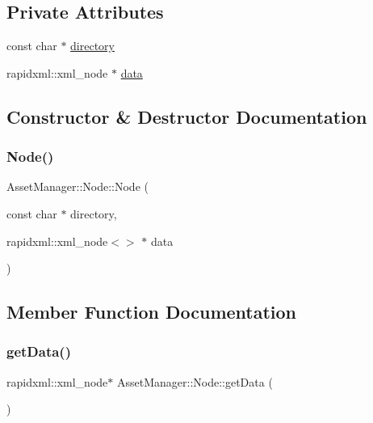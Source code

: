 \subsection*{Private Attributes}
\begin{DoxyCompactItemize}
\item 
const char $\ast$ \hyperlink{class_asset_manager_1_1_node_a26aef3543a3e17b4412ab227fca00ad6}{directory}
\item 
rapidxml\+::xml\+\_\+node $\ast$ \hyperlink{class_asset_manager_1_1_node_addfff47185d0626ec038163a7412fb5f}{data}
\end{DoxyCompactItemize}


\subsection{Constructor \& Destructor Documentation}
\mbox{\label{class_asset_manager_1_1_node_a4ae9e2e6a0b3c35d73d2c4feb00d75ee}} 
\subsubsection{\texorpdfstring{Node()}{Node()}}
{\footnotesize\ttfamily Asset\+Manager\+::\+Node\+::\+Node (\begin{DoxyParamCaption}\item[{const char $\ast$}]{directory,  }\item[{rapidxml\+::xml\+\_\+node$<$$>$ $\ast$}]{data }\end{DoxyParamCaption})\hspace{0.3cm}{\ttfamily [inline]}}



\subsection{Member Function Documentation}
\mbox{\label{class_asset_manager_1_1_node_a908a7d3bbf9b654ab9dc1a7c5cd1e686}} 
\subsubsection{\texorpdfstring{get\+Data()}{getData()}}
{\footnotesize\ttfamily rapidxml\+::xml\+\_\+node$\ast$ Asset\+Manager\+::\+Node\+::get\+Data (\begin{DoxyParamCaption}{ }\end{DoxyParamCaption})\hspace{0.3cm}{\ttfamily [inline]}}

